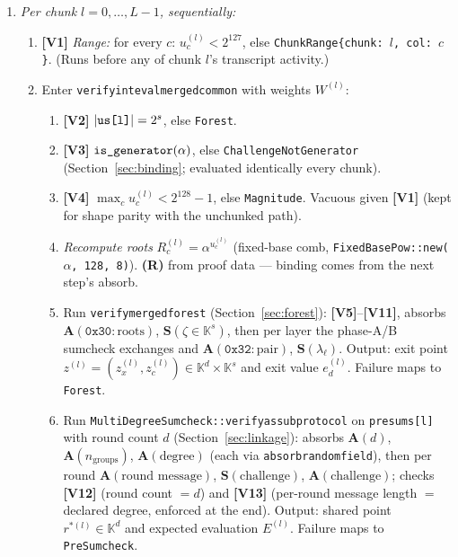 \documentclass[11pt]{article}
\newcommand{\K}{\mathbb{K}}            %
\newcommand{\code}[1]{{\def\_{\textunderscore\allowbreak}\texttt{#1}}}
\newcommand{\Vc}[1]{\textbf{[V#1]}}    %
\begin{document}
\begin{enumerate}[leftmargin=2.2em, itemsep=2pt]
\item \emph{Per chunk $l = 0, \dots, L-1$, sequentially:}
  \begin{enumerate}[leftmargin=1.6em, itemsep=1pt]
  \item \Vc{1} \emph{Range:} for every $c$:
    $u^{(l)}_c < 2^{127}$, else \code{ChunkRange\{chunk: $l$, col: $c$\}}.
    (Runs before any of chunk $l$'s transcript activity.)
  \item Enter \code{verify\_int\_eval\_merged\_common} with weights
    $W^{(l)}$:
    \begin{enumerate}[leftmargin=1.6em, itemsep=1pt]
    \item \Vc{2} $|\code{us[l]}| = 2^s$, else \code{Forest}.
    \item \Vc{3} $\code{is\_generator}(\alpha)$, else
      \code{ChallengeNotGenerator} (Section~\ref{sec:binding}; evaluated
      identically every chunk).
    \item \Vc{4} $\max_c u^{(l)}_c < 2^{128}-1$, else
      \code{Magnitude}.  Vacuous given \Vc{1} (kept for shape parity with
      the unchunked path).
    \item \emph{Recompute roots} $R^{(l)}_c = \alpha^{u^{(l)}_c}$
      (fixed-base comb, \code{FixedBasePow::new($\alpha$, 128, 8)}).
      \textbf{(R)} from proof data — binding comes from the next step's
      absorb.
    \item Run \code{verify\_merged\_forest} (Section~\ref{sec:forest}):
      \Vc{5}–\Vc{11}, absorbs
      $\mathbf{A}(\mathtt{0x30}\!:\!\text{roots})$,
      $\mathbf{S}(\zeta \in \K^s)$, then per layer the phase-A/B sumcheck
      exchanges and
      $\mathbf{A}(\mathtt{0x32}\!:\!\text{pair})$,
      $\mathbf{S}(\lambda_\ell)$.  Output: exit point
      $z^{(l)} = (z_x^{(l)}, z_c^{(l)}) \in \K^{d} \times \K^{s}$ and exit
      value $e_d^{(l)}$.  Failure maps to \code{Forest}.
    \item Run \code{MultiDegreeSumcheck::verify\_as\_subprotocol} on
      \code{presums[l]} with round count $d$
      (Section~\ref{sec:linkage}): absorbs
      $\mathbf{A}(d)$, $\mathbf{A}(n_{\mathrm{groups}})$,
      $\mathbf{A}(\text{degree})$ (each via
      \code{absorb\_random\_field}), then per round
      $\mathbf{A}(\text{round message})$, $\mathbf{S}(\text{challenge})$,
      $\mathbf{A}(\text{challenge})$; checks \Vc{12} (round count $= d$)
      and \Vc{13} (per-round message length $=$ declared degree, enforced
      at the end).  Output: shared point $r^{*(l)} \in \K^{d}$ and
      expected evaluation $E^{(l)}$.  Failure maps to \code{PreSumcheck}.

\end{enumerate}
\end{enumerate}
\end{enumerate}
\end{document}
